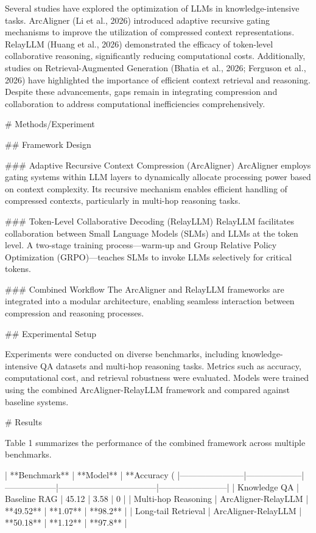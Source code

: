 Several studies have explored the optimization of LLMs in knowledge-intensive tasks. ArcAligner (Li et al., 2026) introduced adaptive recursive gating mechanisms to improve the utilization of compressed context representations. RelayLLM (Huang et al., 2026) demonstrated the efficacy of token-level collaborative reasoning, significantly reducing computational costs. Additionally, studies on Retrieval-Augmented Generation (Bhatia et al., 2026; Ferguson et al., 2026) have highlighted the importance of efficient context retrieval and reasoning. Despite these advancements, gaps remain in integrating compression and collaboration to address computational inefficiencies comprehensively.

# Methods/Experiment

## Framework Design

### Adaptive Recursive Context Compression (ArcAligner)
ArcAligner employs gating systems within LLM layers to dynamically allocate processing power based on context complexity. Its recursive mechanism enables efficient handling of compressed contexts, particularly in multi-hop reasoning tasks.

### Token-Level Collaborative Decoding (RelayLLM)
RelayLLM facilitates collaboration between Small Language Models (SLMs) and LLMs at the token level. A two-stage training process—warm-up and Group Relative Policy Optimization (GRPO)—teaches SLMs to invoke LLMs selectively for critical tokens.

### Combined Workflow
The ArcAligner and RelayLLM frameworks are integrated into a modular architecture, enabling seamless interaction between compression and reasoning processes.

## Experimental Setup

Experiments were conducted on diverse benchmarks, including knowledge-intensive QA datasets and multi-hop reasoning tasks. Metrics such as accuracy, computational cost, and retrieval robustness were evaluated. Models were trained using the combined ArcAligner-RelayLLM framework and compared against baseline systems.

# Results

Table 1 summarizes the performance of the combined framework across multiple benchmarks.

| **Benchmark**        | **Model**          | **Accuracy (%
|-----------------------|--------------------|------------------|-----------------------------------|------------------------|
| Knowledge QA          | Baseline RAG      | 45.12            | 3.58                              | 0                      |
| Multi-hop Reasoning   | ArcAligner-RelayLLM | **49.52**       | **1.07**                          | **98.2**               |
| Long-tail Retrieval   | ArcAligner-RelayLLM | **50.18**       | **1.12**                          | **97.8**               |

